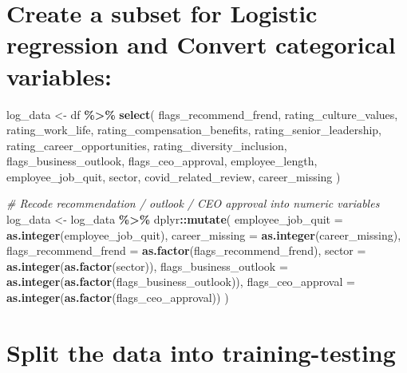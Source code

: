 \documentclass[
]{article}
\newenvironment{Shaded}{\begin{snugshade}}{\end{snugshade}}
\newcommand{\AttributeTok}[1]{\textcolor[rgb]{0.13,0.29,0.53}{#1}}
\newcommand{\CommentTok}[1]{\textcolor[rgb]{0.56,0.35,0.01}{\textit{#1}}}
\newcommand{\FunctionTok}[1]{\textcolor[rgb]{0.13,0.29,0.53}{\textbf{#1}}}
\newcommand{\NormalTok}[1]{#1}
\newcommand{\OtherTok}[1]{\textcolor[rgb]{0.56,0.35,0.01}{#1}}
\newcommand{\SpecialCharTok}[1]{\textcolor[rgb]{0.81,0.36,0.00}{\textbf{#1}}}
\begin{document}
\section{Create a subset for Logistic regression and Convert categorical
variables:}\label{create-a-subset-for-logistic-regression-and-convert-categorical-variables}

\begin{Shaded}
\begin{Highlighting}[]
\NormalTok{log\_data }\OtherTok{\textless{}{-}}\NormalTok{ df }\SpecialCharTok{\%\textgreater{}\%} 
  \FunctionTok{select}\NormalTok{( }
\NormalTok{    flags\_recommend\_frend, }
\NormalTok{    rating\_culture\_values, }
\NormalTok{    rating\_work\_life, }
\NormalTok{    rating\_compensation\_benefits, }
\NormalTok{    rating\_senior\_leadership, }
\NormalTok{    rating\_career\_opportunities, }
\NormalTok{    rating\_diversity\_inclusion, }
\NormalTok{    flags\_business\_outlook, }
\NormalTok{    flags\_ceo\_approval,}
\NormalTok{    employee\_length, }
\NormalTok{    employee\_job\_quit, }
\NormalTok{    sector, }
\NormalTok{    covid\_related\_review, }
\NormalTok{    career\_missing}
\NormalTok{  )}

\CommentTok{\# Recode recommendation / outlook / CEO approval into numeric variables}
\NormalTok{log\_data }\OtherTok{\textless{}{-}}\NormalTok{ log\_data }\SpecialCharTok{\%\textgreater{}\%}
\NormalTok{  dplyr}\SpecialCharTok{::}\FunctionTok{mutate}\NormalTok{(}
    \AttributeTok{employee\_job\_quit =} \FunctionTok{as.integer}\NormalTok{(employee\_job\_quit),}
    \AttributeTok{career\_missing =} \FunctionTok{as.integer}\NormalTok{(career\_missing),}
    \AttributeTok{flags\_recommend\_frend =} \FunctionTok{as.factor}\NormalTok{(flags\_recommend\_frend),}
    \AttributeTok{sector =} \FunctionTok{as.integer}\NormalTok{(}\FunctionTok{as.factor}\NormalTok{(sector)),}
    \AttributeTok{flags\_business\_outlook =} \FunctionTok{as.integer}\NormalTok{(}\FunctionTok{as.factor}\NormalTok{(flags\_business\_outlook)),}
    \AttributeTok{flags\_ceo\_approval =} \FunctionTok{as.integer}\NormalTok{(}\FunctionTok{as.factor}\NormalTok{(flags\_ceo\_approval))}
\NormalTok{  )}
\end{Highlighting}
\end{Shaded}

\section{Split the data into
training-testing}\label{split-the-data-into-training-testing}
\end{document}
